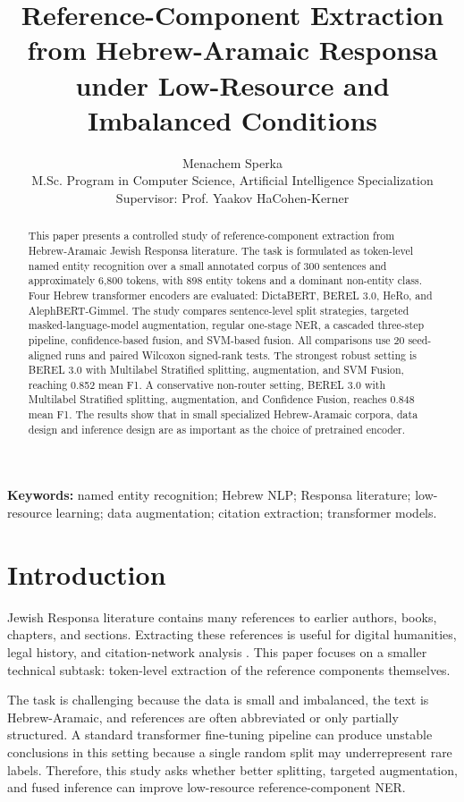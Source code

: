 \documentclass[11pt,a4paper]{article}
\title{Reference-Component Extraction from Hebrew-Aramaic Responsa under Low-Resource and Imbalanced Conditions}
\author{Menachem Sperka\\M.Sc. Program in Computer Science, Artificial Intelligence Specialization\\Supervisor: Prof. Yaakov HaCohen-Kerner}
\date{}
\begin{document}
\maketitle

\begin{abstract}
This paper presents a controlled study of reference-component extraction from Hebrew-Aramaic Jewish Responsa literature. The task is formulated as token-level named entity recognition over a small annotated corpus of 300 sentences and approximately 6,800 tokens, with 898 entity tokens and a dominant non-entity class. Four Hebrew transformer encoders are evaluated: DictaBERT, BEREL 3.0, HeRo, and AlephBERT-Gimmel. The study compares sentence-level split strategies, targeted masked-language-model augmentation, regular one-stage NER, a cascaded three-step pipeline, confidence-based fusion, and SVM-based fusion. All comparisons use 20 seed-aligned runs and paired Wilcoxon signed-rank tests. The strongest robust setting is BEREL 3.0 with Multilabel Stratified splitting, augmentation, and SVM Fusion, reaching 0.852 mean F1. A conservative non-router setting, BEREL 3.0 with Multilabel Stratified splitting, augmentation, and Confidence Fusion, reaches 0.848 mean F1. The results show that in small specialized Hebrew-Aramaic corpora, data design and inference design are as important as the choice of pretrained encoder.
\end{abstract}

\textbf{Keywords:} named entity recognition; Hebrew NLP; Responsa literature; low-resource learning; data augmentation; citation extraction; transformer models.

\section{Introduction}
Jewish Responsa literature contains many references to earlier authors, books, chapters, and sections. Extracting these references is useful for digital humanities, legal history, and citation-network analysis \citep{satlow2022,bengigi2025}. This paper focuses on a smaller technical subtask: token-level extraction of the reference components themselves.

The task is challenging because the data is small and imbalanced, the text is Hebrew-Aramaic, and references are often abbreviated or only partially structured. A standard transformer fine-tuning pipeline can produce unstable conclusions in this setting because a single random split may underrepresent rare labels. Therefore, this study asks whether better splitting, targeted augmentation, and fused inference can improve low-resource reference-component NER.
\end{document}
